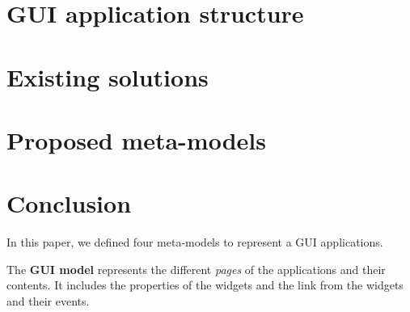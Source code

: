 \documentclass[conference]{IEEEtran}
\begin{document}
\section{GUI application structure}
\label{sec:guiAppDiv}


\section{Existing solutions}
\label{sec:solutions}







\section{Proposed meta-models}
\label{sec:contribution}





\section{Conclusion}
\label{sec:conclusion}


In this paper, we defined four meta-models to represent a GUI applications.

The \textbf{GUI model} represents the different \textit{pages} of the applications and their contents.
It includes the properties of the widgets and the link from the widgets and their events.
\end{document}
